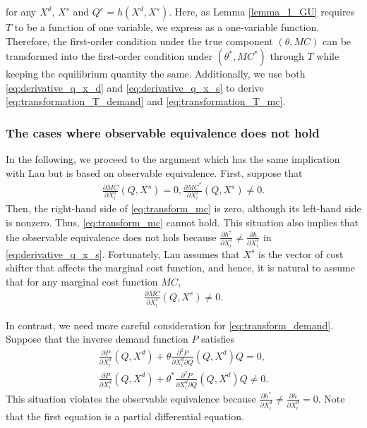 \documentclass[11pt, a4paper]{article}
\theoremstyle{remark}
\begin{document}
for any $X^{d}$, $X^{s}$ and $Q^e = h(X^{d}, X^{s})$.
Here, as Lemma \ref{lemma_1_GU} requires $T$ to be a function of one variable, we express as a one-variable function.
Therefore, the first-order condition under the true component $(\theta, MC)$ can be transformed into the first-order condition under $(\theta^*, MC^*)$ through $T$ while keeping the equilibrium quantity the same.
Additionally, we use both \eqref{eq:derivative_q_x_d} and \eqref{eq:derivative_q_x_s} to derive \eqref{eq:transformation_T_demand} and \eqref{eq:transformation_T_mc}.

















\subsubsection{The cases where observable equivalence does not hold}




In the following, we proceed to the argument which has the same implication with Lau but is based on observable equivalence.
First, suppose that
\begin{align}
    \frac{\partial MC}{\partial X_i^{s}}(Q, X^{s}) = 0, \frac{\partial MC^{*}}{\partial X_i^{s}}(Q, X^{s}) \ne 0.
\end{align}
Then, the right-hand side of \eqref{eq:transform_mc} is zero, although its left-hand side is nonzero.
Thus, \eqref{eq:transform_mc} cannot hold.
This situation also implies that the observable equivalence does not hols because $\frac{\partial h^{*}}{\partial X^{s}_{i}}  \ne \frac{\partial h}{\partial X^{s}_{i}}$ in \eqref{eq:derivative_q_x_s}.
Fortunately, Lau assumes that $X^{s}$ is the vector of cost shifter that affects the marginal cost function, and hence, it is natural to assume that for any marginal cost function $MC$, 
\begin{align}
    \frac{\partial MC}{\partial X_i^{s}}(Q, X^{s}) \ne 0.
\end{align}



In contrast, we need more careful consideration for \eqref{eq:transform_demand}.
Suppose that the inverse demand function $P$ satisfies
\begin{align}
    \frac{\partial P}{\partial X^{d}_{i}}(Q, X^{d}) + \theta \frac{\partial^2 P}{\partial X^{d}_{i}\partial Q}(Q, X^{d})Q = 0,\\
    \frac{\partial P}{\partial X^{d}_{i}}(Q, X^{d}) + \theta^{*} \frac{\partial^2 P}{\partial X^{d}_{i}\partial Q}(Q, X^{d})Q \ne 0. 
\end{align}
This situation violates the observable equivalence because $\frac{\partial h^{*}}{\partial X^{d}_{i}}  \ne \frac{\partial h}{\partial X^{d}_{i}} =0$.
Note that the first equation is a partial differential equation.
\end{document}
